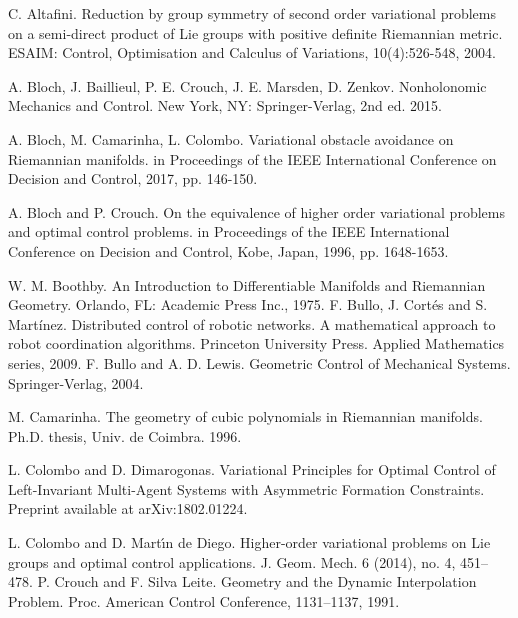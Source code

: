 \documentclass[letterpaper, 10 pt, conference]{ieeeconf}  %
\begin{document}
\begin{thebibliography}{1}

 C. Altafini. Reduction by group symmetry of second order variational problems on a semi-direct product of Lie groups with positive definite Riemannian metric. ESAIM: Control, Optimisation and Calculus of Variations, 10(4):526-548, 2004.

  A. Bloch, J. Baillieul, P. E. Crouch, J. E. Marsden, D. Zenkov. Nonholonomic Mechanics and Control.  New York, NY: Springer-Verlag, 2nd ed. 2015.

 A. Bloch, M. Camarinha, L. Colombo. Variational obstacle avoidance on Riemannian manifolds. in Proceedings of the IEEE
International Conference on Decision and Control, 2017, pp. 146-150. 

 A. Bloch and P. Crouch. On the equivalence of higher order variational
problems and optimal control problems. in Proceedings of the IEEE
International Conference on Decision and Control, Kobe, Japan, 1996,
pp. 1648-1653.


 W.  M.  Boothby. An  Introduction  to  Differentiable  Manifolds  and Riemannian Geometry. Orlando,  FL: Academic  Press Inc., 1975.
 F. Bullo, J. Cort\'es and S. Mart\'inez. Distributed control of robotic networks. A mathematical approach to robot coordination algorithms. Princeton University Press. Applied Mathematics series, 2009.
  F. Bullo and A. D. Lewis. Geometric Control of Mechanical Systems. Springer-Verlag,  2004.

 M. Camarinha. The geometry of cubic polynomials in Riemannian manifolds.
Ph.D. thesis, Univ. de Coimbra. 1996.

 L. Colombo and D. Dimarogonas. Variational Principles for Optimal Control of Left-Invariant Multi-Agent Systems with Asymmetric Formation Constraints. Preprint available at  arXiv:1802.01224.

 L. Colombo and D. Mart\'{\i}n de Diego. Higher-order variational problems on Lie groups and optimal control applications. J. Geom. Mech. 6 (2014), no. 4, 451--478.
 P. Crouch and F. Silva Leite. Geometry and the Dynamic
Interpolation Problem. Proc. American Control Conference, 1131--1137, 1991.


\end{thebibliography}
\end{document}
